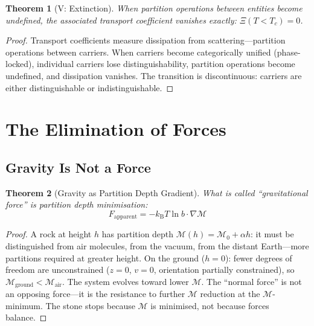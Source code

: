 \documentclass[11pt,twocolumn,a4paper]{article}
\newtheorem{theorem}{Theorem}[section]
\theoremstyle{definition}
\theoremstyle{remark}
\newcommand{\kB}{k_{\mathrm{B}}}
\newcommand{\Depth}{\mathcal{M}}
\begin{document}
\begin{theorem}[V: Extinction]
\label{thm:extinction}
When partition operations between entities become undefined, the associated transport coefficient vanishes exactly: $\Xi(T < T_c) = 0$.
\end{theorem}

\begin{proof}
Transport coefficients measure dissipation from scattering---partition operations between carriers. When carriers become categorically unified (phase-locked), individual carriers lose distinguishability, partition operations become undefined, and dissipation vanishes. The transition is discontinuous: carriers are either distinguishable or indistinguishable.
\end{proof}

\section{The Elimination of Forces}
\label{sec:elimination}

\subsection{Gravity Is Not a Force}

\begin{theorem}[Gravity as Partition Depth Gradient]
\label{thm:gravity}
What is called ``gravitational force'' is partition depth minimisation:
\begin{equation}
F_{\mathrm{apparent}} = -\kB T \ln b \cdot \nabla\Depth
\end{equation}
\end{theorem}

\begin{proof}
A rock at height $h$ has partition depth $\Depth(h) = \Depth_0 + \alpha h$: it must be distinguished from air molecules, from the vacuum, from the distant Earth---more partitions required at greater height. On the ground ($h = 0$): fewer degrees of freedom are unconstrained ($z = 0$, $v = 0$, orientation partially constrained), so $\Depth_{\mathrm{ground}} < \Depth_{\mathrm{air}}$. The system evolves toward lower $\Depth$. The ``normal force'' is not an opposing force---it is the resistance to further $\Depth$ reduction at the $\Depth$-minimum. The stone stops because $\Depth$ is minimised, not because forces balance.
\end{proof}
\end{document}
